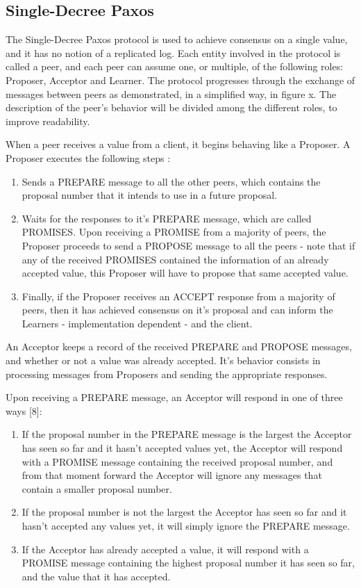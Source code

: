 \subsection{Single-Decree Paxos}

The Single-Decree Paxos protocol \cite{paxos_made_simple} is used to achieve consensus on a single value, and it has no notion of a replicated log. Each entity involved in the protocol is called a peer, and each peer can assume one, or multiple, of the following roles: Proposer, Acceptor and Learner. The protocol progresses through the exchange of messages between peers as demonstrated, in a simplified way, in figure x. The description of the peer’s behavior will be divided among the different roles, to improve readability.

When a peer receives a value from a client, it begins behaving like a Proposer. A Proposer executes the following steps \cite{paxos_made_simple}:

\begin{enumerate}
  \item Sends a PREPARE message to all the other peers, which contains the proposal number that it intends to use in a future proposal.
  \item Waits for the responses to it’s PREPARE message, which are called PROMISES. Upon receiving a PROMISE from a majority of peers, the Proposer proceeds to send a PROPOSE message to all the peers - note that if any of the received PROMISES contained the information of an already accepted value, this Proposer will have to propose that same accepted value.
  \item Finally, if the Proposer receives an ACCEPT response from a majority of peers, then it has achieved consensus on it’s proposal and can inform the Learners - implementation dependent - and the client.
\end{enumerate}

An Acceptor keeps a record of the received PREPARE and PROPOSE messages, and whether or not a value was already accepted. It’s behavior consists in processing messages from Proposers and sending the appropriate responses.

Upon receiving a PREPARE message, an Acceptor will respond in one of three ways [8]:

\begin{enumerate}
  \item If the proposal number in the PREPARE message is the largest the Acceptor has seen so far and it hasn’t accepted values yet, the Acceptor will respond with a PROMISE message containing the received proposal number, and from that moment forward the Acceptor will ignore any messages that contain a smaller proposal number.
  \item If the proposal number is not the largest the Acceptor has seen so far and it hasn’t accepted any values yet, it will simply ignore the PREPARE message.
  \item If the Acceptor has already accepted a value, it will respond with a PROMISE message containing the highest proposal number it has seen so far, and the value that it has accepted.
\end{enumerate}

